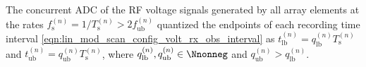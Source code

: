 The concurrent \ac{ADC} of
the \ac{RF} voltage signals generated by
all array elements at
the rates
$f_{\text{s}}^{(n)} = 1 / T_{\text{s}}^{(n)} > 2 f_{\text{ub}}^{(n)}$ quantized
the endpoints of
each recording time interval
\eqref{eqn:lin_mod_scan_config_volt_rx_obs_interval} as
$t_{\text{lb}}^{(n)} = q_{\text{lb}}^{(n)} T_{\text{s}}^{(n)}$ and
$t_{\text{ub}}^{(n)} = q_{\text{ub}}^{(n)} T_{\text{s}}^{(n)}$, where
$q_{\text{lb}}^{(n)}, q_{\text{ub}}^{(n)} \in \Nnonneg$ and
$q_{\text{ub}}^{(n)} > q_{\text{lb}}^{(n)}$.

